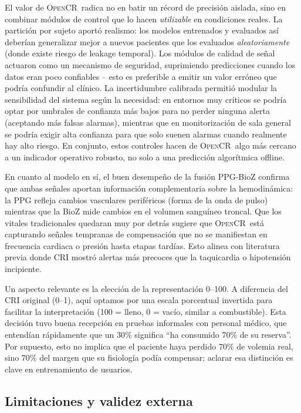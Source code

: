 \documentclass[10pt,a4paper,twocolumn]{article}
\newcommand{\OpenCR}{\textsc{OpenCR}}
\begin{document}
El valor de \OpenCR\ radica no en batir un r\'ecord de precisi\'on aislada, sino en combinar m\'odulos de control que lo hacen \emph{utilizable} en condiciones reales. La partici\'on por sujeto aport\'o realismo: los modelos entrenados y evaluados as\'i deber\'ian generalizar mejor a nuevos pacientes que los evaluados \emph{aleatoriamente} (donde existe riesgo de leakage temporal). Los m\'odulos de calidad de se\~nal actuaron como un mecanismo de seguridad, suprimiendo predicciones cuando los datos eran poco confiables -- esto es preferible a emitir un valor err\'oneo que podr\'ia confundir al cl\'inico. La incertidumbre calibrada permiti\'o modular la sensibilidad del sistema seg\'un la necesidad: en entornos muy cr\'iticos se podr\'ia optar por umbrales de confianza m\'as bajos para no perder ninguna alerta (aceptando m\'as falsas alarmas), mientras que en monitorizaci\'on de sala general se podr\'ia exigir alta confianza para que solo suenen alarmas cuando realmente hay alto riesgo. En conjunto, estos controles hacen de \OpenCR\ algo m\'as cercano a un indicador operativo robusto, no solo a una predicci\'on algor\'itmica offline.

En cuanto al modelo en s\'i, el buen desempe\~no de la fusi\'on PPG-BioZ confirma que ambas se\~nales aportan informaci\'on complementaria sobre la hemodin\'amica: la PPG refleja cambios vasculares perif\'ericos (forma de la onda de pulso) mientras que la BioZ mide cambios en el volumen sangu\'ineo troncal. Que los vitales tradicionales quedaran muy por detr\'as sugiere que \OpenCR\ est\'a capturando se\~nales tempranas de compensaci\'on que no se manifiestan en frecuencia cardiaca o presi\'on hasta etapas tard\'ias. Esto alinea con literatura previa donde CRI mostr\'o alertas m\'as precoces que la taquicardia o hipotensi\'on incipiente.

Un aspecto relevante es la elecci\'on de la representaci\'on 0--100. A diferencia del CRI original (0--1), aqu\'i optamos por una escala porcentual invertida para facilitar la interpretaci\'on (100 = lleno, 0 = vac\'io, similar a combustible). Esta decisi\'on tuvo buena recepci\'on en pruebas informales con personal m\'edico, que entend\'ian r\'apidamente que un 30\% significa ``ha consumido 70\% de su reserva''. Por supuesto, esto no implica que el paciente haya perdido 70\% de volemia real, sino 70\% del margen que su fisiolog\'ia pod\'ia compensar; aclarar esa distinci\'on es clave en entrenamiento de usuarios.
\subsection{Limitaciones y validez externa}
\end{document}
